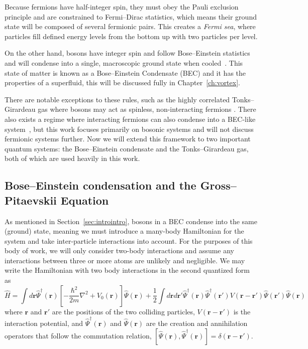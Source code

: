 Because fermions have half-integer spin, they must obey the Pauli exclusion principle and are constrained to Fermi--Dirac statistics, which means their ground state will be composed of several fermionic pairs.
This creates a \textit{Fermi sea}, where particles fill defined energy levels from the bottom up with two particles per level.

On the other hand, bosons have integer spin and follow Bose--Einstein statistics and will condense into a single, macroscopic ground state when cooled~\cite{Einstein1925, Fetter2003}.
This state of matter is known as a Bose--Einstein Condensate (BEC) and it has the properties of a superfluid, this will be discussed fully in Chapter~\ref{ch:vortex}.

There are notable exceptions to these rules, such as the highly correlated Tonks--Girardeau gas where bosons may act as spinless, non-interacting fermions \cite{Girardeau}.
There also exists a regime where interacting fermions can also condense into a BEC-like system~\cite{Nozieres1985, Bulgac2014}, but this work focuses primarily on bosonic systems and will not discuss fermionic systems further.
Now we will extend this framework to two important quantum systems: the Bose--Einstein condensate and the Tonks--Girardeau gas, both of which are used heavily in this work.


\subsection{Bose--Einstein condensation and the Gross--Pitaevskii Equation}

As mentioned in Section~\ref{sec:introintro}, bosons in a BEC condense into the same (ground) state, meaning we must introduce a many-body Hamiltonian for the system and take inter-particle interactions into account.
For the purposes of this body of work, we will only consider two-body interactions and assume any interactions between three or more atoms are unlikely and negligible.
We may write the Hamiltonian with two body interactions in the second quantized form as
\begin{equation}
    \hat H = \int d\mathbf{r} \hat \Psi^\dagger(\mathbf{r})\left[-\frac{\hbar^2}{2m}\nabla^2 + V_0(\mathbf{r}) \right]\hat \Psi(\mathbf{r}) + \frac{1}{2} \int d\mathbf{r} d\mathbf{r'} \hat \Psi^\dagger(\mathbf{r}) \hat \Psi^\dagger(\mathbf{r'}) V(\mathbf{r} - \mathbf{r'})\hat \Psi(\mathbf{r'}) \hat \Psi(\mathbf{r})
    \label{eqn:2nd}
\end{equation}
where $\mathbf{r}$ and $\mathbf{r'}$ are the positions of the two colliding particles, $V(\mathbf{r}-\mathbf{r'})$ is the interaction potential, and $\hat \Psi^\dagger(\mathbf{r})$ and $\hat \Psi(\mathbf{r})$ are the creation and annihilation operators that follow the commutation relation, $[\hat \Psi(\mathbf{r}),\hat \Psi^\dagger(\mathbf{r})] = \delta(\mathbf{r} - \mathbf{r'})$.

